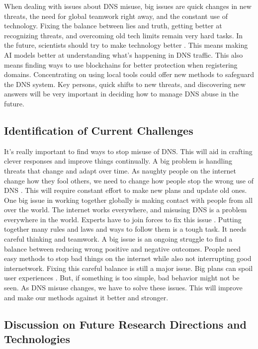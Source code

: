 When dealing with issues about DNS misuse, big issues are quick changes in new threats, the need for global teamwork right away, and the constant use of technology. Fixing the balance between lies and truth, getting better at recognizing threats, and overcoming old tech limits remain very hard tasks. In the future, scientists should try to make technology better \cite{pour2023comprehensive}. This means making AI models better at understanding what's happening in DNS traffic. This also means finding ways to use blockchains for better protection when registering domains. Concentrating on using local tools could offer new methods to safeguard the DNS system. Key persons, quick shifts to new threats, and discovering new answers will be very important in deciding how to manage DNS abuse in the future.


\subsection{Identification of Current Challenges}

It's really important to find ways to stop misuse of DNS. This will aid in crafting clever responses and improve things continually. A big problem is handling threats that change and adapt over time. As naughty people on the internet change how they fool others, we need to change how people stop the wrong use of DNS \cite{bhattacharya2023dns}. This will require constant effort to make new plans and update old ones. One big issue in working together globally is making contact with people from all over the world. The internet works everywhere, and misusing DNS is a problem everywhere in the world. Experts have to join forces to fix this issue \cite{altulaihan2022cybersecurity}. Putting together many rules and laws and ways to follow them is a tough task. It needs careful thinking and teamwork. A big issue is an ongoing struggle to find a balance between reducing wrong positive and negative outcomes. People need easy methods to stop bad things on the internet while also not interrupting good internetwork. Fixing this careful balance is still a major issue. Big plans can spoil user experiences \cite{lyu2022survey}. But, if something is too simple, bad behavior might not be seen. As DNS misuse changes, we have to solve these issues. This will improve and make our methods against it better and stronger.

\subsection{Discussion on Future Research Directions and Technologies}

